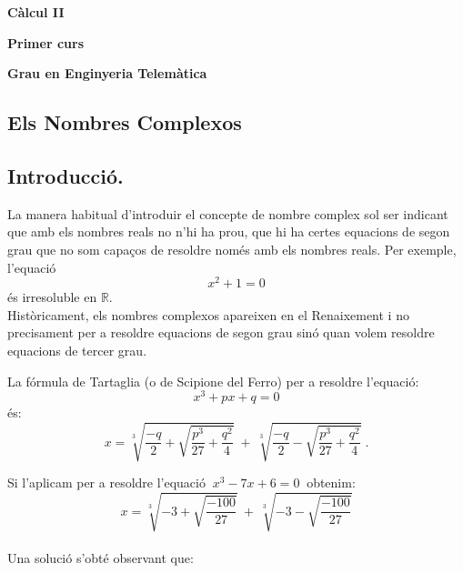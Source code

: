 \documentclass[12pt]{article}
\newcommand{\R}{\mathbb{R}}
\begin{document}
\vspace*{7cm}
\begin{center}
\textbf{\Huge{C{\`a}lcul II}}

\vspace*{2cm}\textbf{\LARGE{Primer curs}}

\vspace*{2cm}\textbf{\LARGE{Grau en Enginyeria Telem{\`a}tica}}
\end{center}

\thispagestyle{empty}

\newpage




\begin{center}
\section{Els Nombres Complexos}
\end{center}

\parskip =0.3cm
\parindent =0cm
\itemindent=2cm

\subsection{Introducci{\'o}.}

La manera habitual d'introduir el concepte de nombre complex sol ser
indicant que amb els nombres reals no n'hi ha prou, que hi ha certes
equacions de segon grau que no som capa\c{c}os de resoldre nom{\'e}s amb els
nombres reals. Per exemple, l'equaci{\'o}
$$x^{2}+1=0$$
\'{e}s irresoluble en $\R$.\\

Hist{\`o}ricament, els nombres complexos apareixen en el Renaixement i
no precisament per a resoldre equacions de segon grau sin\'{o} quan
volem resoldre equacions de tercer grau.

La f{\'o}rmula de Tartaglia (o de Scipione del Ferro) per a
resoldre l'equaci{\'o}:
$$x^{3}+px+q=0$$
\'{e}s:
$$x=\sqrt[3]{\frac{-q}{2}+\sqrt{\frac{p^{3}}{27}+\frac{q^2}{4}}}
\ +\ \sqrt[3]{\frac{-q}{2}-\sqrt{\frac{p^{3}}{27}+\frac{q^2}{4}}}\
.$$

Si l'aplicam per a resoldre l'equaci{\'o} $\ x^{3}-7x+6=0\ $
obtenim:\\

$$x=\sqrt[3]{-3+\sqrt{\frac{-100}{27}}}\ +\ \sqrt[3]{-3-\sqrt{\frac{-100}{27}}}$$\\

Una soluci{\'o} s'obt\'{e} observant que:
\end{document}
